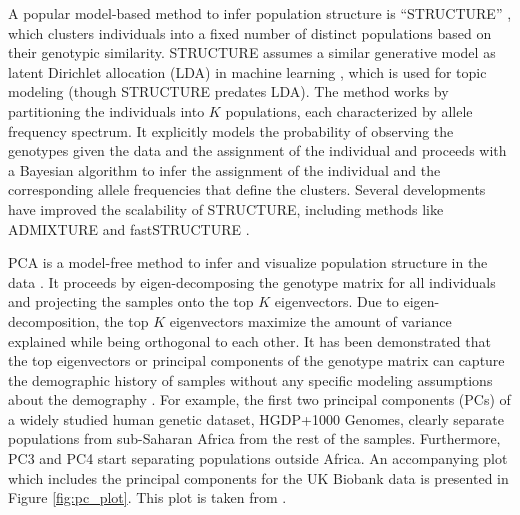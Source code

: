 A popular model-based method to infer population structure is ``STRUCTURE'' \cite{Pritchard2000}, which clusters individuals into a fixed number of distinct populations based on their genotypic similarity. STRUCTURE assumes a similar generative model as latent Dirichlet allocation (LDA) in machine learning \cite{Blei2003}, which is used for topic modeling (though STRUCTURE predates LDA). The method works by partitioning the individuals into \(K\) populations, each characterized by allele frequency spectrum. It explicitly models the probability of observing the genotypes given the data and the assignment of the individual and proceeds with a Bayesian algorithm to infer the assignment of the individual and the corresponding allele frequencies that define the clusters. Several developments have improved the scalability of STRUCTURE, including methods like ADMIXTURE \cite{Alexander2009} and fastSTRUCTURE \cite{Raj2014}.

PCA is a model-free method to infer and visualize population structure in the data \cite{menozzi1978synthetic,Patterson2006, price2006principal}. It proceeds by eigen-decomposing the genotype matrix for all individuals and projecting the samples onto the top \(K\) eigenvectors. Due to eigen-decomposition, the top \(K\) eigenvectors maximize the amount of variance explained while being orthogonal to each other. It has been demonstrated that the top eigenvectors or principal components of the genotype matrix can capture the demographic history of samples without any specific modeling assumptions about the demography \cite{Patterson2006,novembre2008interpreting}. For example, the first two principal components (PCs) of a widely studied human genetic dataset, HGDP+1000 Genomes, clearly separate populations from sub-Saharan Africa from the rest of the samples. Furthermore, PC3 and PC4 start separating populations outside Africa. An accompanying plot which includes the principal components for the UK Biobank data is presented in Figure \ref{fig:pc_plot}. This plot is taken from \cite{bycroft2018uk}.

